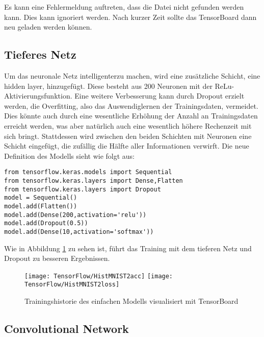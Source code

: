 
Es kann eine Fehlermeldung auftreten, dass die Datei nicht gefunden werden kann. Dies kann ignoriert werden. Nach kurzer Zeit sollte das TensorBoard
dann neu geladen werden können.

\subsection{Tieferes Netz}

Um das neuronale Netz \glqq intelligenter\grqq  zu machen, wird eine zusätzliche Schicht, eine \glqq hidden layer\grqq, hinzugefügt. 
Diese besteht aus 200 Neuronen mit der ReLu-Aktivierungsfunktion.
Eine weitere Verbesserung kann durch Dropout erzielt werden, die \glqq Overfitting\grqq, also das Auswendiglernen der Trainingsdaten, vermeidet.
Dies könnte auch durch eine wesentliche Erhöhung der Anzahl an Trainingsdaten erreicht werden, was aber natürlich auch eine wesentlich 
höhere Rechenzeit mit sich bringt. Stattdessen wird zwischen den beiden Schichten mit Neuronen eine Schicht eingefügt, die zufällig die Hälfte 
aller Informationen verwirft. Die neue Definition des Modells sieht wie folgt aus:

\begin{verbatim}
from tensorflow.keras.models import Sequential
from tensorflow.keras.layers import Dense,Flatten
from tensorflow.keras.layers import Dropout
model = Sequential()
model.add(Flatten())
model.add(Dense(200,activation='relu'))
model.add(Dropout(0.5))
model.add(Dense(10,activation='softmax'))
\end{verbatim}

Wie in Abbildung \ref{HistMNIST2} zu sehen ist, führt das Training mit dem tieferen Netz und Dropout zu besseren Ergebnissen.

\begin{figure}[H]
	\begin{center}
		\texttt{[image: TensorFlow/HistMNIST2acc]}
		\texttt{[image: TensorFlow/HistMNIST2loss]}
		\caption{Trainingshistorie des einfachen Modells visualisiert mit TensorBoard} 
		\label{HistMNIST2}
	\end{center}
\end{figure}



\subsection{Convolutional Network}

